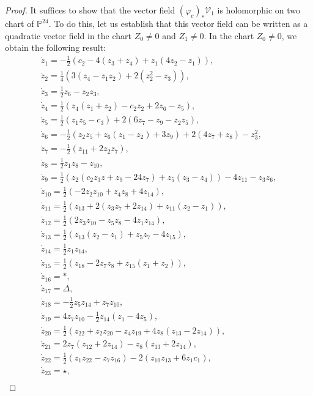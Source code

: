 \documentclass[10pt,a4paper]{amsart}
\numberwithin{equation}{section}
\begin{document}
\begin{proof}
It suffices to show that the vector field
$(\varphi_c)_{\ast}\mathcal{V}_1$ is holomorphic on two
chart of $\mathbb{P}^{24}$. To do this, let us establish that this
vector field can be written as a quadratic vector field in the chart
$Z_0\neq0$ and $Z_1\neq0$. In the chart $Z_0\neq0$, we obtain the
following result:
\begin{gather*}
 \dot{z}_1= -\frac{1}{2}(c_2-4(z_3+z_4)+z_1(4z_2-z_1)) ,\\
 \dot{z}_2= \frac{1}{4}(3(z_4-z_1z_2)+2(z_2^2-z_3)) ,\\
 \dot{z}_3= \frac{1}{2}z_6-z_2z_3 ,\\
 \dot{z}_4= \frac{1}{2}(z_4(z_1+z_2)-c_2z_2+2z_6-z_5) ,\\
 \dot{z}_5= \frac{1}{2}(z_1z_5-c_3)+2(6z_7-z_9-z_2z_5) ,\\
 \dot{z}_6= -\frac{1}{2}(z_2z_5+z_6(z_1-z_2)+3z_9)+2(4z_7+z_8)-z_3^2 ,\\
 \dot{z}_7= -\frac{1}{2}(z_{11}+2z_2z_7) ,\\
 \dot{z}_8= \frac{1}{2}z_1z_8-z_{10} ,\\
 \dot{z}_9= \frac{1}{2}(z_2(c_2z_3z+z_9-24z_7)+z_5(z_3-z_4))-4z_{11}-z_3z_6 ,\\
 \dot{z}_{10}= \frac{1}{2}(-2z_2z_{10}+z_4z_8+4z_{14}) ,\\
 \dot{z}_{11}= \frac{1}{2}(z_{13}+2(z_3z_7+2z_{14})+z_{11}(z_2-z_1)) ,\\
 \dot{z}_{12}= \frac{1}{2}(2z_3z_{10}-z_5z_8-4z_1z_{14}) ,\\
 \dot{z}_{13}= \frac{1}{2}(z_{13}(z_2-z_1)+z_5z_7-4z_{15}) ,\\
 \dot{z}_{14}= \frac{1}{2}z_1z_{14} ,\\
 \dot{z}_{15}= \frac{1}{2}(z_{18}-2z_7z_8+z_{15}(z_1+z_2)),\\
 \dot{z}_{16}= \ast,\\
 \dot{z}_{17}= \Delta,\\
 \dot{z}_{18}= -\frac{1}{2}z_5z_{14}+z_7z_{10},\\
 \dot{z}_{19}= 4z_7z_{10}-\frac{1}{2}z_{14}(z_1-4z_5) ,\\
 \dot{z}_{20}= \frac{1}{2}(z_{22}+z_2z_{20}-z_4z_{19}+4z_8(z_{13}-2z_{14})),\\
 \dot{z}_{21}= 2z_7(z_{12}+2z_{14})-z_8(z_{13}+2z_{14}),\\
 \dot{z}_{22}= \frac{1}{2}(z_1z_{22}-z_7z_{16})-2(z_{10}z_{13}+6z_1c_1) ,\\
 \dot{z}_{23}= \star ,\\

\end{gather*}
\end{proof}
\end{document}
